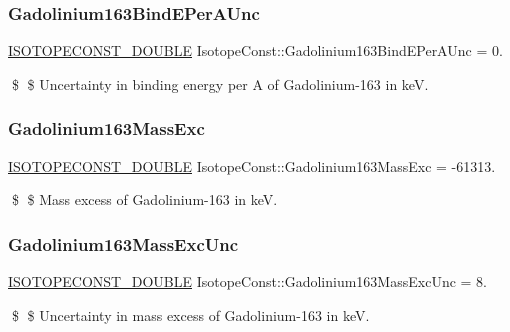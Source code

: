 \subsubsection{\texorpdfstring{Gadolinium163\+Bind\+E\+Per\+A\+Unc}{Gadolinium163BindEPerAUnc}}
{\footnotesize\ttfamily \mbox{\hyperlink{group___isotope_const-_macros_ga8f45a7272ce02c0b4c65c44636ed719a}{I\+S\+O\+T\+O\+P\+E\+C\+O\+N\+S\+T\+\_\+\+D\+O\+U\+B\+LE}} Isotope\+Const\+::\+Gadolinium163\+Bind\+E\+Per\+A\+Unc = 0.}

\$ \$ Uncertainty in binding energy per A of Gadolinium-\/163 in keV. \mbox{\label{group___isotope_const-_gadolinium-_gd163_gaccf226375703033fbe6eb35283bba216}} 
\subsubsection{\texorpdfstring{Gadolinium163\+Mass\+Exc}{Gadolinium163MassExc}}
{\footnotesize\ttfamily \mbox{\hyperlink{group___isotope_const-_macros_ga8f45a7272ce02c0b4c65c44636ed719a}{I\+S\+O\+T\+O\+P\+E\+C\+O\+N\+S\+T\+\_\+\+D\+O\+U\+B\+LE}} Isotope\+Const\+::\+Gadolinium163\+Mass\+Exc = -\/61313.}

\$ \$ Mass excess of Gadolinium-\/163 in keV. \mbox{\label{group___isotope_const-_gadolinium-_gd163_ga2ddf5b27dff5268c1d7cc63892929b90}} 
\subsubsection{\texorpdfstring{Gadolinium163\+Mass\+Exc\+Unc}{Gadolinium163MassExcUnc}}
{\footnotesize\ttfamily \mbox{\hyperlink{group___isotope_const-_macros_ga8f45a7272ce02c0b4c65c44636ed719a}{I\+S\+O\+T\+O\+P\+E\+C\+O\+N\+S\+T\+\_\+\+D\+O\+U\+B\+LE}} Isotope\+Const\+::\+Gadolinium163\+Mass\+Exc\+Unc = 8.}

\$ \$ Uncertainty in mass excess of Gadolinium-\/163 in keV. \mbox{\label{group___isotope_const-_gadolinium-_gd163_ga87dfb9e8e682526dcec0c8bbd76fa817}} 
